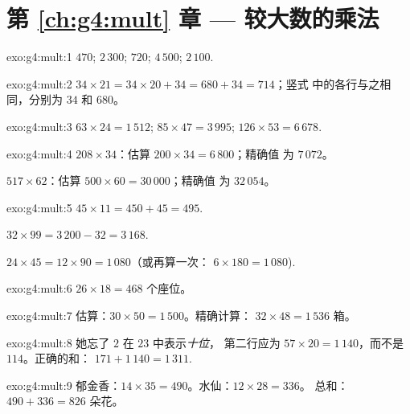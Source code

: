\section*{第 \ref{ch:g4:mult} 章 --- 较大数的乘法}

\begin{solution}{exo:g4:mult:1}
$470$; \quad $2\,300$; \quad $720$; \quad $4\,500$; \quad
$2\,100$.
\end{solution}

\begin{solution}{exo:g4:mult:2}
$34 \times 21 = 34 \times 20 + 34 = 680 + 34 = 714$；竖式
中的各行与之相同，分别为 $34$ 和 $680$。
\end{solution}

\begin{solution}{exo:g4:mult:3}
$63 \times 24 = 1\,512$; \quad
$85 \times 47 = 3\,995$; \quad
$126 \times 53 = 6\,678$.
\end{solution}

\begin{solution}{exo:g4:mult:4}
$208 \times 34$：估算 $200 \times 34 = 6\,800$；精确值
为 $7\,072$。

$517 \times 62$：估算 $500 \times 60 = 30\,000$；精确值
为 $32\,054$。
\end{solution}

\begin{solution}{exo:g4:mult:5}
$45 \times 11 = 450 + 45 = 495$.

$32 \times 99 = 3\,200 - 32 = 3\,168$.

$24 \times 45 = 12 \times 90 = 1\,080$（或再算一次：
$6 \times 180 = 1\,080$).
\end{solution}

\begin{solution}{exo:g4:mult:6}
$26 \times 18 = 468$ 个座位。
\end{solution}

\begin{solution}{exo:g4:mult:7}
估算：$30 \times 50 = 1\,500$。精确计算：
$32 \times 48 = 1\,536$ 箱。
\end{solution}

\begin{solution}{exo:g4:mult:8}
她忘了 $2$ 在 $23$ 中表示\emph{十位}，
第二行应为 $57 \times 20 = 1\,140$，而不是 $114$。正确的和：
$171 + 1\,140 = 1\,311$.
\end{solution}

\begin{solution}{exo:g4:mult:9}
郁金香：$14 \times 35 = 490$。水仙：$12 \times 28 = 336$。
总和：$490 + 336 = 826$ 朵花。
\end{solution}

